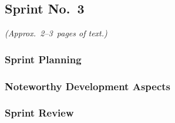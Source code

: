 
\subsection{Sprint No.~3}

\emph{(Approx.~2--3~pages of text.)}

\subsubsection*{Sprint Planning}

\subsubsection*{Noteworthy Development Aspects}

\subsubsection*{Sprint Review}


